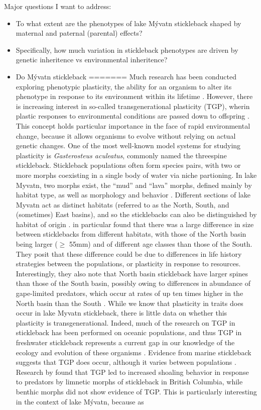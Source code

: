 \documentclass[12pt]{extarticle}
\begin{document}
Major questions I want to address:
\begin{itemize}
 \item To what extent are the phenotypes of lake M\'yvatn stickleback 
shaped by maternal and paternal (parental) effects?
 \item Specifically, how much variation in stickleback phenotypes are driven by genetic inheritence vs environmental inheritence?
 \item Do M\'yvatn stickleback 
=======
Much research has been conducted exploring phenotypic plasticity, the ability for an organism to alter its phenotype in response to its environment within its lifetime \citep{Denver2010, Kishida2010, Klemetsen2010}. However, there is increasing interest in so-called transgenerational plasticity (TGP), wherin plastic responses to environmental conditions are passed down to offspring \citep{Hellmann2020, Richter-Boix2014, Bell2019, Shama2014}. This concept holds particular importance in the face of rapid environmental change, because it allows organisms to evolve without relying on actual genetic changes. One of the most well-known model systems for studying plasticity is \textit{Gasterosteus aculeatus}, commonly named the threespine stickleback. Stickleback populations often form species pairs, with two or more morphs coexisting in a single body of water via niche partioning. In lake Myvatn, two morphs exist, the ``mud'' and ``lava'' morphs, defined mainly by habitat type, as well as morphology and behavior \citep{Kristjansson2002, Millet2013}. Different sections of lake Myvatn act as distinct habitats (referred to as the North, South, and (sometimes) East basins), and so the sticklebacks can also be distinguished by habitat of origin \citep{Millet2013, Einarsson2004}. \citet{Millet2013} in particular found that there was a large difference in size between sticklebacks from different habitats, with those of the North basin being larger ($\ge$ 55mm) and of different age classes than those of the South. They posit that these difference could be due to differences in life history strategies between the populations, or plasticity in response to resources. Interestingly, they also note that North basin stickleback have larger spines than those of the South basin, possibly owing to differences in abundance of gape-limited predators, which occur at rates of up ten times higher in the North basin than the South \citep{Millet2013}. While we know that plasticity in traits does occur in lake Myvatn stickleback, there is little data on whether this plasticity is transgenerational. Indeed, much of the research on TGP in stickleback has been performed on oceanic populations, and thus TGP in freshwater stickleback represents a current gap in our knowledge of the ecology and evolution of these organisms \citep{Shama2014}. Evidence from marine stickleback suggests that TGP does occur, although it varies between populations \citep{Shama2014, Heckwolf2018, Kozak2012}. Research by \citet{Kozak2012} found that TGP led to increased shoaling behavior in response to predators by limnetic morphs of stickleback in British Columbia, while benthic morphs did not show evidence of TGP. This is particularly interesting in the context of lake M\'yvatn, because as 
\end{itemize}
\end{document}
